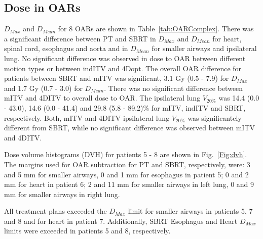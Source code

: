 \documentclass[type=dr, dr=rernat, accentcolor=tud7b,colorbacktitle, bigchapter, openright, twoside, 12pt ]{tudthesis}
\begin{document}
\subsection{Dose in OARs}

$D_{Max}$ and $D_{Mean}$ for 8 OARs are shown in Table~\ref{tab:OARComplex}. There was a significant difference between PT and SBRT in $D_{Max}$ and $D_{Mean}$ for heart, spinal cord, esophagus and aorta and in $D_{Mean}$ for smaller airways and
ipsilateral lung.
No significant difference was observed in dose to OAR between different motion types or between indITV and 4Dopt.
The overall OAR difference for patients between SBRT and mITV
was significant, 3.1 Gy (0.5 - 7.9)  for $D_{Max}$ and 1.7 Gy (0.7 - 3.0) for $D_{Mean}$. There was no significant difference between mITV and 4DITV to overall dose to OAR.
The ipsilateral lung $V_{20\%}$ was 14.4 (0.0 - 43.0), 14.6 (0.0 - 41.4) and 29.8 (5.8 - 89.2)\% for mITV, indITV and SBRT, respectively. Both, mITV and 4DITV ipsilateral lung $V_{20\%}$ was
significantely different from SBRT, while no significant difference was observed between mITV and 4DITV.

Dose volume histograms (DVH) for patients 5 - 8 are shown in Fig.~\ref{Fig:dvh}. The margins used for OAR subtraction for PT and SBRT, respectively, were:
3 and 5 mm for smaller airways, 0 and 1 mm for esophagus in patient 5; 
0 and 2 mm for heart in patient 6; 
2 and 11 mm for smaller airways in left lung, 0 and 9 mm for smaller airways in right lung.

All treatment plans exceeded the $D_{Max}$ limit for smaller airways in patients 5, 7 and 8 and for heart in patient 7. 
Additionally, SBRT Esophagus and Heart $D_{Max}$ limits were exceeded in patients 5 and 8, respectively.
\end{document}
